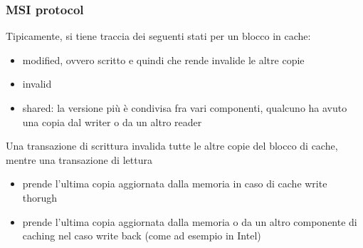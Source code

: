 \documentclass[14pt, oneside]{book}
\begin{document}
\subsubsection{MSI protocol}
Tipicamente, si tiene traccia dei seguenti stati per un blocco in cache:
\begin{itemize}
\item modified, ovvero scritto e quindi che rende invalide le altre copie
\item invalid
\item shared: la versione più è condivisa fra vari componenti, qualcuno ha avuto una copia dal writer o da un altro reader
\end{itemize}
Una transazione di scrittura invalida tutte le altre copie del blocco di cache, mentre una transazione di lettura
\begin{itemize}
\item prende l'ultima copia aggiornata dalla memoria in caso di cache write thorugh
\item prende l'ultima copia aggiornata dalla memoria o da un altro componente  di caching nel caso write back (come ad esempio in Intel)
\end{itemize}
\end{document}
